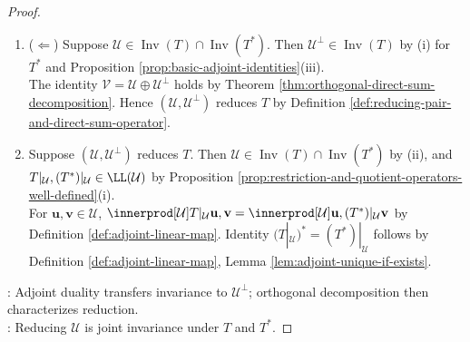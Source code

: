 \begin{theorem}
\begin{proof}
\begin{enumerate}[label=(\roman*)]
\item[$(ii)$] ($\Leftarrow$) Suppose $\mathcal{U}\in\operatorname{Inv}(T)\cap\operatorname{Inv}(T^*)$. Then $\mathcal{U}^{\perp}\in\operatorname{Inv}(T)$ by (i) for $T^*$ and Proposition \ref{prop:basic-adjoint-identities}(iii).\\
The identity $\mathcal{V}=\mathcal{U}\oplus\mathcal{U}^{\perp}$ holds by Theorem \ref{thm:orthogonal-direct-sum-decomposition}. Hence $(\mathcal{U},\mathcal{U}^{\perp})$ reduces $T$ by Definition \ref{def:reducing-pair-and-direct-sum-operator}.
\item[$(iii)$] Suppose $(\mathcal{U},\mathcal{U}^{\perp})$ reduces $T$. Then $\mathcal{U}\in\operatorname{Inv}(T)\cap\operatorname{Inv}(T^*)$ by (ii), and $T|_{\mathcal{U}},(T^*)|_{\mathcal{U}}\in\LL(\mathcal{U})$ by Proposition \ref{prop:restriction-and-quotient-operators-well-defined}(i).\\
For $\mathbf{u},\mathbf{v}\in\mathcal{U}$, $\innerprod[\mathcal{U}]{T|_{\mathcal{U}}\mathbf{u},\mathbf{v}}=\innerprod[\mathcal{U}]{\mathbf{u},(T^*)|_{\mathcal{U}}\mathbf{v}}$ by Definition \ref{def:adjoint-linear-map}. Identity $(T|_{\mathcal{U}})^*=(T^*)|_{\mathcal{U}}$ follows by Definition \ref{def:adjoint-linear-map}, Lemma \ref{lem:adjoint-unique-if-exists}.
\end{enumerate}
: Adjoint duality transfers invariance to $\mathcal{U}^{\perp}$; orthogonal decomposition then characterizes reduction.\\
: Reducing $\mathcal{U}$ is joint invariance under $T$ and $T^*$.
\end{proof}
\end{theorem}

